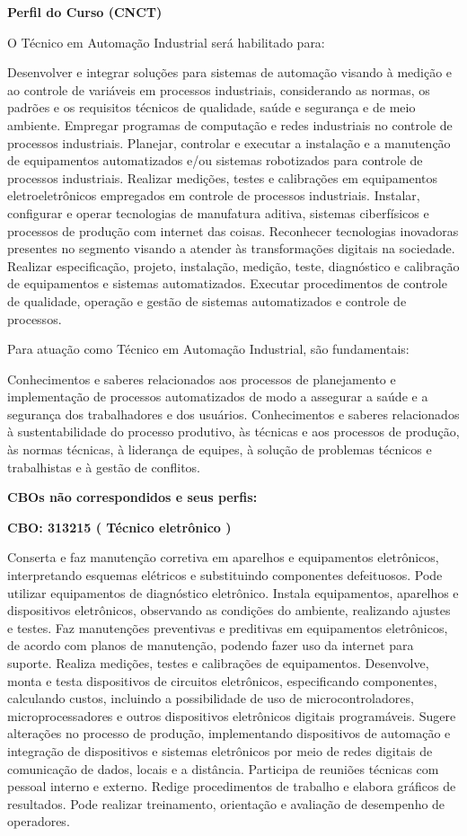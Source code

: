 \documentclass[
]{article}
\begin{document}
\textbf{Perfil do Curso (CNCT)}

O Técnico em Automação Industrial será habilitado para:

Desenvolver e integrar soluções para sistemas de automação visando à
medição e ao controle de variáveis em processos industriais,
considerando as normas, os padrões e os requisitos técnicos de
qualidade, saúde e segurança e de meio ambiente. Empregar programas de
computação e redes industriais no controle de processos industriais.
Planejar, controlar e executar a instalação e a manutenção de
equipamentos automatizados e/ou sistemas robotizados para controle de
processos industriais. Realizar medições, testes e calibrações em
equipamentos eletroeletrônicos empregados em controle de processos
industriais. Instalar, configurar e operar tecnologias de manufatura
aditiva, sistemas ciberfísicos e processos de produção com internet das
coisas. Reconhecer tecnologias inovadoras presentes no segmento visando
a atender às transformações digitais na sociedade. Realizar
especificação, projeto, instalação, medição, teste, diagnóstico e
calibração de equipamentos e sistemas automatizados. Executar
procedimentos de controle de qualidade, operação e gestão de sistemas
automatizados e controle de processos.

Para atuação como Técnico em Automação Industrial, são fundamentais:

Conhecimentos e saberes relacionados aos processos de planejamento e
implementação de processos automatizados de modo a assegurar a saúde e a
segurança dos trabalhadores e dos usuários. Conhecimentos e saberes
relacionados à sustentabilidade do processo produtivo, às técnicas e aos
processos de produção, às normas técnicas, à liderança de equipes, à
solução de problemas técnicos e trabalhistas e à gestão de conflitos.

\textbf{CBOs não correspondidos e seus perfis:}

\textbf{CBO: 313215  ( Técnico eletrônico )}

Conserta e faz manutenção corretiva em aparelhos e equipamentos
eletrônicos, interpretando esquemas elétricos e substituindo componentes
defeituosos. Pode utilizar equipamentos de diagnóstico eletrônico.
Instala equipamentos, aparelhos e dispositivos eletrônicos, observando
as condições do ambiente, realizando ajustes e testes. Faz manutenções
preventivas e preditivas em equipamentos eletrônicos, de acordo com
planos de manutenção, podendo fazer uso da internet para suporte.
Realiza medições, testes e calibrações de equipamentos. Desenvolve,
monta e testa dispositivos de circuitos eletrônicos, especificando
componentes, calculando custos, incluindo a possibilidade de uso de
microcontroladores, microprocessadores e outros dispositivos eletrônicos
digitais programáveis. Sugere alterações no processo de produção,
implementando dispositivos de automação e integração de dispositivos e
sistemas eletrônicos por meio de redes digitais de comunicação de dados,
locais e a distância. Participa de reuniões técnicas com pessoal interno
e externo. Redige procedimentos de trabalho e elabora gráficos de
resultados. Pode realizar treinamento, orientação e avaliação de
desempenho de operadores.
\end{document}
